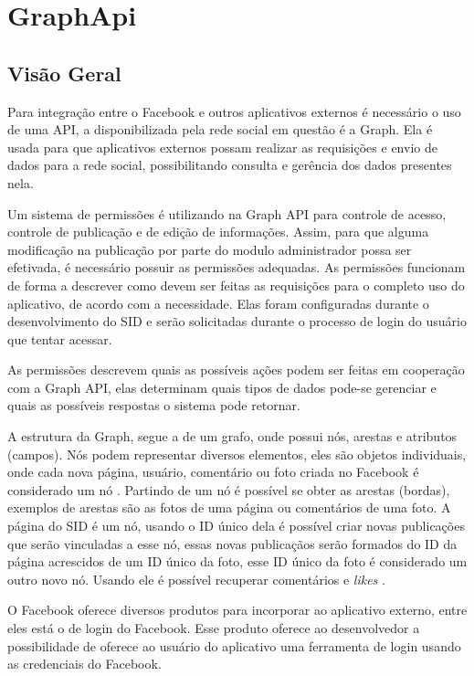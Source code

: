 \chapter[GraphApi]{GraphApi}

\section{Visão Geral}
Para integração entre o Facebook e outros aplicativos externos é necessário o uso de uma API, a disponibilizada pela rede social em questão é a Graph. Ela é usada para que aplicativos externos possam realizar as requisições e envio de dados para a rede social, possibilitando consulta e gerência dos dados presentes nela. 

Um sistema de permissões é utilizando na Graph API para controle de acesso, controle de publicação e de edição de informações. Assim, para que alguma modificação na publicação por parte do modulo administrador possa ser efetivada, é necessário possuir as permissões adequadas. As permissões funcionam de forma a descrever como devem ser feitas as requisições para o completo uso do aplicativo, de acordo com a necessidade. Elas foram configuradas durante o desenvolvimento do SID e serão solicitadas durante o processo de login do usuário que tentar acessar.

As permissões descrevem quais as possíveis ações podem ser feitas em cooperação com a Graph API, elas determinam quais tipos de dados pode-se gerenciar e quais as possíveis respostas o sistema pode retornar.

A estrutura da Graph, segue a de um grafo, onde possui nós, arestas e atributos (campos). Nós podem representar diversos elementos, eles são objetos individuais, onde cada nova página, usuário, comentário ou foto criada no Facebook é considerado um nó \cite{facebook2018b}. Partindo de um nó é possível se obter as arestas (bordas), exemplos de arestas são as fotos de uma página ou comentários de uma foto. A página do SID é um nó, usando o ID único dela é possível criar novas publicações que serão vinculadas a esse nó, essas novas publicaçãos serão formados do ID da página acrescidos de um ID único da foto, esse ID único da foto é considerado um outro novo nó. Usando ele é possível recuperar comentários e \textit{likes} \cite{facebook2018b}.

O Facebook oferece diversos produtos para incorporar ao aplicativo externo, entre eles está o de login do Facebook. Esse produto oferece ao desenvolvedor a possibilidade de oferece ao usuário do aplicativo uma ferramenta de login usando as credenciais do Facebook.

